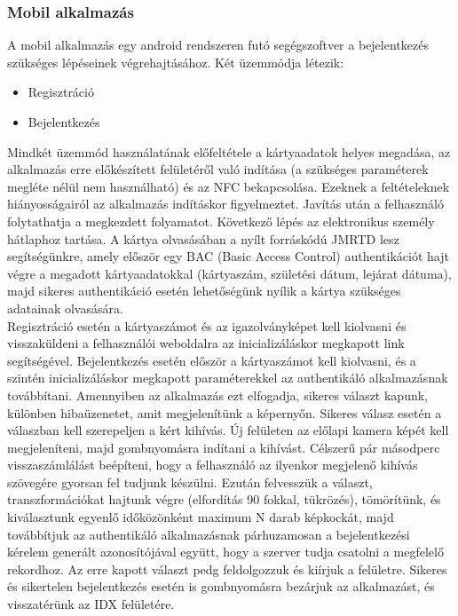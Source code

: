\subsubsection{Mobil alkalmazás}
A mobil alkalmazás egy android rendszeren futó segégszoftver a bejelentkezés szükséges lépéseinek végrehajtásához. Két üzemmódja létezik:
\begin{itemize}
\item Regisztráció
\item Bejelentkezés
\end{itemize}

Mindkét üzemmód használatának előfeltétele a kártyaadatok helyes megadása, az alkalmazás erre előkészített felületéről való indítása (a szükséges paraméterek megléte nélül nem használható) és az NFC bekapcsolása. Ezeknek a feltételeknek hiányosságairól az alkalmazás indításkor figyelmeztet. Javítás után a felhasználó folytathatja a megkezdett folyamatot. Következő lépés az elektronikus személy hátlaphoz tartása. A kártya olvasásában a nyílt forráskódú JMRTD lesz segítségünkre, amely először egy BAC (Basic Access Control) authentikációt hajt végre a megadott kártyaadatokkal (kártyaszám, születési dátum, lejárat dátuma), majd sikeres authentikáció esetén lehetőségünk nyílik a kártya szükséges adatainak olvasására.
\\Regisztráció esetén a kártyaszámot és az igazolványképet kell kiolvasni és visszaküldeni a felhasználói weboldalra az inicializáláskor megkapott link segítségével.
Bejelentkezés esetén először a kártyaszámot kell kiolvasni, és a szintén inicializáláskor megkapott paraméterekkel az authentikáló alkalmazásnak továbbítani. Amennyiben az alkalmazás ezt elfogadja, sikeres választ kapunk, különben hibaüzenetet, amit megjelenítünk a képernyőn. Sikeres válasz esetén a válaszban kell szerepeljen a kért kihívás. Új felületen az előlapi kamera képét kell megjeleníteni, majd gombnyomásra indítani a kihívást. Célszerű pár másodperc visszaszámlálást beépíteni, hogy a felhasználó az ilyenkor megjelenő kihívás szövegére gyorsan fel tudjunk készülni. Ezután felvesszük a választ, transzformációkat hajtunk végre (elfordítás 90 fokkal, tükrözés), tömörítünk, és kiválasztunk egyenlő időközönként maximum N darab képkockát, majd továbbítjuk az authentikáló alkalmazásnak párhuzamosan a bejelentkezési kérelem generált azonosítójával együtt, hogy a szerver tudja csatolni a megfelelő rekordhoz. Az erre kapott választ pedg feldolgozzuk és kiírjuk a felületre. Sikeres és sikertelen bejelentkezés esetén is gombnyomásra bezárjuk az alkalmazást, és visszatérünk az IDX felületére.

